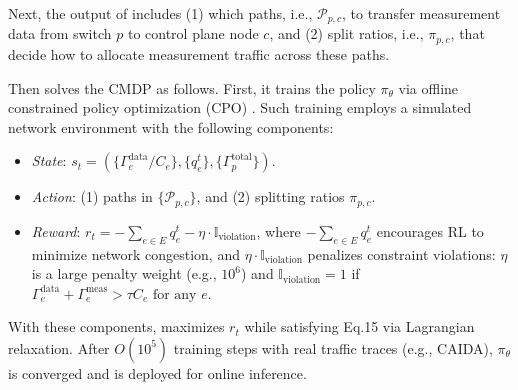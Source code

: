 Next, the output of \sysname includes (1) which paths, i.e., $\mathcal{P}_{p,c}$, to transfer measurement data from switch $p$ to control plane node $c$, and (2) split ratios, i.e., $\pi_{p,c}$, that decide how to allocate measurement traffic across these paths. 

Then \sysname solves the CMDP as follows. First, it trains the policy $\pi_\theta$ via offline constrained policy optimization (CPO) \cite{achiam2017constrained}. Such training employs a simulated network environment with the following components: 
\begin{itemize}[leftmargin=*,noitemsep]
\item \textit{State}: $s_t = \left( \{ \Gamma_e^{\text{data}}/C_e \}, \{q_e^t\}, \{\Gamma_p^{\text{total}}\} \right)$.
\item \textit{Action}: (1) paths in $\{\mathcal{P}_{p,c}\}$, and (2) splitting ratios $\pi_{p,c}$.
\item \textit{Reward}: $r_t = -\sum_{e \in E} q_e^t - \eta \cdot \mathbb{I}_{\text{violation}}$, where $-\sum_{e \in E} q_e^t$ encourages RL to minimize network congestion, and $\eta \cdot \mathbb{I}_{\text{violation}}$ penalizes constraint violations: $\eta$ is a large penalty weight (e.g., $10^6$) and $\mathbb{I}_{\text{violation}}=1$ if $\Gamma_e^{\text{data}} + \Gamma_e^{\text{meas}} > \tau C_e \text{ for any } e$. 
\end{itemize}

\noindent With these components, \sysname maximizes $r_t$ while satisfying Eq.15 via Lagrangian relaxation. After $O(10^5)$ training steps with real traffic traces (e.g., CAIDA), $\pi_\theta$ is converged and is deployed for online inference.

